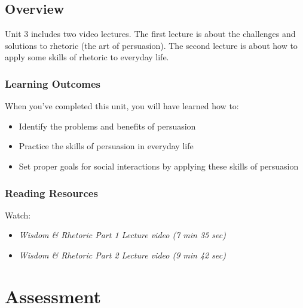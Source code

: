 \documentclass[
]{book}
\providecommand{\tightlist}{%
  \setlength{\itemsep}{0pt}\setlength{\parskip}{0pt}}
\begin{document}
\hypertarget{overview-2}{%
\section{Overview}\label{overview-2}}

Unit 3 includes two video lectures. The first lecture is about the challenges and solutions to rhetoric (the art of persuasion). The second lecture is about how to apply some skills of rhetoric to everyday life.

\hypertarget{learning-outcomes-2}{%
\subsection*{Learning Outcomes}\label{learning-outcomes-2}}

When you've completed this unit, you will have learned how to:

\begin{itemize}
\tightlist
\item
  Identify the problems and benefits of persuasion
\item
  Practice the skills of persuasion in everyday life
\item
  Set proper goals for social interactions by applying these skills of persuasion
\end{itemize}

\hypertarget{reading-resources-2}{%
\subsection*{Reading Resources}\label{reading-resources-2}}

Watch:

\begin{itemize}
\tightlist
\item
  \emph{Wisdom \& Rhetoric Part 1 Lecture video (7 min 35 sec)}
\end{itemize}

\begin{itemize}
\tightlist
\item
  \emph{Wisdom \& Rhetoric Part 2 Lecture video (9 min 42 sec)}
\end{itemize}

\hypertarget{assessment}{%
\chapter*{Assessment}\label{assessment}}
\end{document}
